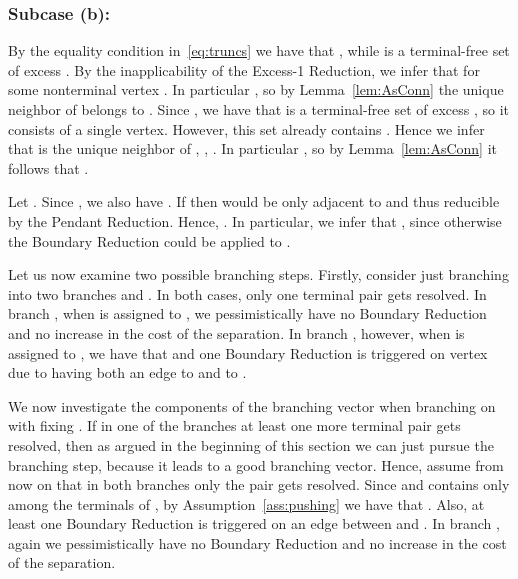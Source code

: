 \subsubsection{Subcase (b): }

By the equality condition in~\eqref{eq:truncs} we have that , while  is a terminal-free set of excess . By the inapplicability of the Excess-1 Reduction, we infer that  for some nonterminal vertex . In particular , so by Lemma~\ref{lem:AsConn} the unique neighbor  of  belongs to . Since , we have that  is a terminal-free set of excess , so it consists of a single vertex. However, this set already contains . Hence we infer that  is the unique neighbor of , , . In particular , so by Lemma~\ref{lem:AsConn} it follows that .

Let . Since , we also have . If  then  would be only adjacent to  and thus reducible by the Pendant Reduction. Hence, . In particular, we infer that , since otherwise the Boundary Reduction could be applied to .














Let us now examine two possible branching steps. Firstly, consider just branching into two branches  and . In both cases, only one terminal pair  gets resolved. In branch , when  is assigned to , we pessimistically have no Boundary Reduction and no increase in the cost of the separation. In branch , however, when  is assigned to , we have that  and one Boundary Reduction is triggered on vertex  due to having both an edge to  and to .

We now investigate the components of the branching vector when branching on  with fixing . If in one of the branches at least one more terminal pair gets resolved, then as argued in the beginning of this section we can just pursue the branching step, because it leads to a good branching vector. Hence, assume from now on that in both branches only the pair  gets resolved. Since  and  contains only  among the terminals of , by Assumption~\ref{ass:pushing} we have that . Also, at least one Boundary Reduction is triggered on an edge between  and . In branch , again we pessimistically have no Boundary Reduction and no increase in the cost of the separation.

